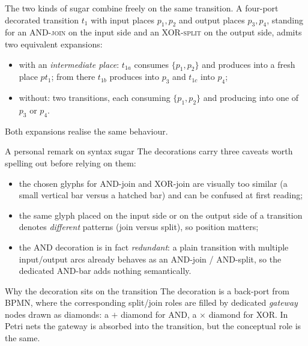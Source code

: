 The two kinds of sugar combine freely on the same transition. A four-port decorated transition $t_1$ with input places $p_1, p_2$ and output places $p_3, p_4$, standing for an \textsc{AND-join} on the input side and an \textsc{XOR-split} on the output side, admits two equivalent expansions:

\begin{itemize}
  \item with an \emph{intermediate place}: $t_{1a}$ consumes $\{p_1, p_2\}$ and produces into a fresh place $pt_1$; from there $t_{1b}$ produces into $p_3$ and $t_{1c}$ into $p_4$;
  \item without: two transitions, each consuming $\{p_1, p_2\}$ and producing into one of $p_3$ or $p_4$.
\end{itemize}

Both expansions realise the same behaviour.



\begin{notebox}{A personal remark on syntax sugar}
The decorations carry three caveats worth spelling out before relying on them:
\begin{itemize}
  \item the chosen glyphs for AND-join and XOR-join are visually too similar (a small vertical bar versus a hatched bar) and can be confused at first reading;
  \item the same glyph placed on the input side or on the output side of a transition denotes \emph{different} patterns (join versus split), so position matters;
  \item the AND decoration is in fact \emph{redundant}: a plain transition with multiple input/output arcs already behaves as an AND-join / AND-split, so the dedicated AND-bar adds nothing semantically.
\end{itemize}
\end{notebox}

\begin{notebox}{Why the decoration sits on the transition}
The decoration is a back-port from BPMN, where the corresponding split/join roles are filled by dedicated \emph{gateway} nodes drawn as diamonds: a $+$ diamond for AND, a $\times$ diamond for XOR. In Petri nets the gateway is absorbed into the transition, but the conceptual role is the same.
\end{notebox}

